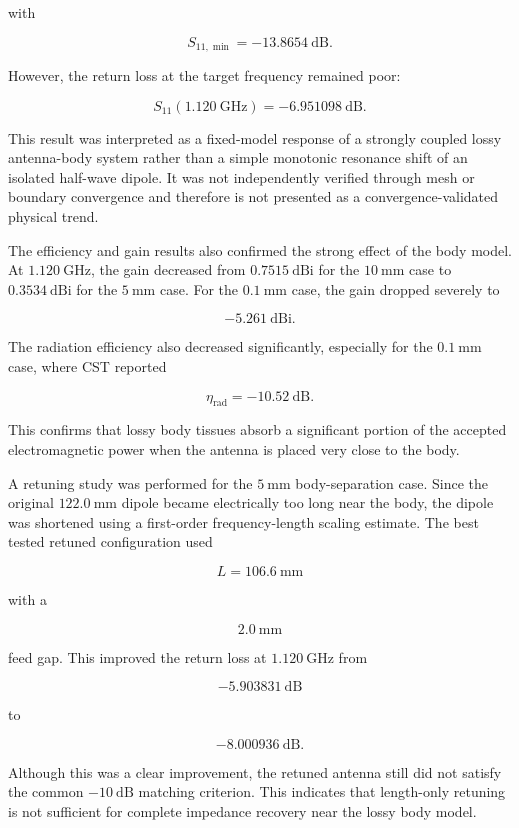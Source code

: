 with

\[
S_{11,\min} = -13.8654~\mathrm{dB}.
\]

However, the return loss at the target frequency remained poor:

\[
S_{11}(1.120~\mathrm{GHz}) = -6.951098~\mathrm{dB}.
\]

This result was interpreted as a fixed-model response of a strongly coupled lossy antenna-body system rather than a simple monotonic resonance shift of an isolated half-wave dipole. It was not independently verified through mesh or boundary convergence and therefore is not presented as a convergence-validated physical trend.

The efficiency and gain results also confirmed the strong effect of the body model. At \(1.120~\mathrm{GHz}\), the gain decreased from \(0.7515~\mathrm{dBi}\) for the \(10~\mathrm{mm}\) case to \(0.3534~\mathrm{dBi}\) for the \(5~\mathrm{mm}\) case. For the \(0.1~\mathrm{mm}\) case, the gain dropped severely to

\[
-5.261~\mathrm{dBi}.
\]

The radiation efficiency also decreased significantly, especially for the \(0.1~\mathrm{mm}\) case, where CST reported

\[
\eta_{\mathrm{rad}} = -10.52~\mathrm{dB}.
\]

This confirms that lossy body tissues absorb a significant portion of the accepted electromagnetic power when the antenna is placed very close to the body.

A retuning study was performed for the \(5~\mathrm{mm}\) body-separation case. Since the original \(122.0~\mathrm{mm}\) dipole became electrically too long near the body, the dipole was shortened using a first-order frequency-length scaling estimate. The best tested retuned configuration used

\[
L = 106.6~\mathrm{mm}
\]

with a

\[
2.0~\mathrm{mm}
\]

feed gap. This improved the return loss at \(1.120~\mathrm{GHz}\) from

\[
-5.903831~\mathrm{dB}
\]

to

\[
-8.000936~\mathrm{dB}.
\]

Although this was a clear improvement, the retuned antenna still did not satisfy the common \(-10~\mathrm{dB}\) matching criterion. This indicates that length-only retuning is not sufficient for complete impedance recovery near the lossy body model.


